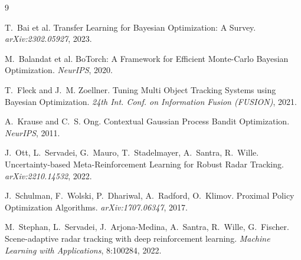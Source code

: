 \documentclass[11pt]{article}
\begin{document}
\begin{thebibliography}{9}

T.~Bai et al.
\newblock Transfer Learning for Bayesian Optimization: A Survey.
\newblock \emph{arXiv:2302.05927}, 2023.

M.~Balandat et al.
\newblock BoTorch: A Framework for Efficient Monte-Carlo Bayesian
Optimization.
\newblock \emph{NeurIPS}, 2020.

T.~Fleck and J.~M. Zoellner.
\newblock Tuning Multi Object Tracking Systems using Bayesian
Optimization.
\newblock \emph{24th Int. Conf. on Information Fusion (FUSION)}, 2021.

A.~Krause and C.~S. Ong.
\newblock Contextual Gaussian Process Bandit Optimization.
\newblock \emph{NeurIPS}, 2011.

J.~Ott, L.~Servadei, G.~Mauro, T.~Stadelmayer, A.~Santra, R.~Wille.
\newblock Uncertainty-based Meta-Reinforcement Learning for Robust
Radar Tracking.
\newblock \emph{arXiv:2210.14532}, 2022.

J.~Schulman, F.~Wolski, P.~Dhariwal, A.~Radford, O.~Klimov.
\newblock Proximal Policy Optimization Algorithms.
\newblock \emph{arXiv:1707.06347}, 2017.

M.~Stephan, L.~Servadei, J.~Arjona-Medina, A.~Santra, R.~Wille,
G.~Fischer.
\newblock Scene-adaptive radar tracking with deep reinforcement
learning.
\newblock \emph{Machine Learning with Applications}, 8:100284, 2022.

\end{thebibliography}
\end{document}
